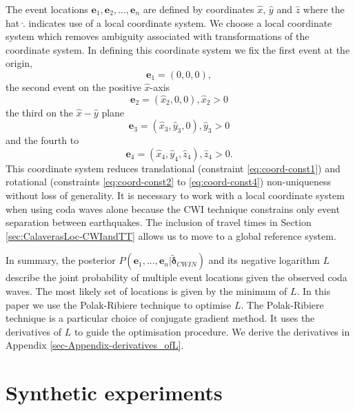 \documentclass[extra]{gji}
\begin{document}
The event locations $\mathbf{e}_1, \mathbf{e}_2, ..., \mathbf{e}_n$
are defined by coordinates $\hat{x}$, $\hat{y}$ and $\hat{z}$
where the hat $\hat{.}$ indicates use of
a local coordinate system. We choose a local coordinate system
which removes ambiguity associated with transformations of the coordinate system.
In defining this coordinate system we fix the first event at the origin,
\begin{equation}
\label{eq:coord-const1}
\mathbf{e}_1 = (0,0,0),
\end{equation}
the second event on the positive $\hat{x}$-axis
\begin{equation}
\label{eq:coord-const2}
\mathbf{e}_2 = (\hat{x}_2, 0, 0), \hat{x}_2>0
\end{equation}
the third on the $\hat{x}-\hat{y}$ plane
\begin{equation}
\label{eq:coord-const3}
\mathbf{e}_3 = (\hat{x}_3,\hat{y}_3,0), \hat{y}_3>0
\end{equation}
and the fourth to
\begin{equation}
\label{eq:coord-const4}
\mathbf{e}_4 = (\hat{x}_4,\hat{y}_4,\hat{z}_4), \hat{z}_4>0.
\end{equation}
This coordinate system reduces translational (constraint \ref{eq:coord-const1})
and rotational (constraints \ref{eq:coord-const2} to \ref{eq:coord-const4}) non-uniqueness
without loss of generality. It is necessary to work with a local coordinate
system when using coda waves alone because the CWI technique constrains only event separation
between earthquakes. The inclusion of travel times in Section \ref{sec:CalaverasLoc-CWIandTT}
allows us to move to a global reference system.

In summary, the posterior $P(\mathbf{e}_1,...,\mathbf{e}_n | \widetilde{\mathbf{\delta}}_{CWIN})$ and its negative
logarithm $L$ describe the joint probability of multiple event locations given the observed coda waves.
The most likely set of locations is given by the minimum of $L$.   In this paper we use the Polak-Ribiere
technique \citep{dr_Press87a} to optimise $L$. The Polak-Ribiere
technique is a particular choice of conjugate gradient method. It uses the
derivatives of $L$ to guide the optimisation procedure. We derive the derivatives in Appendix \ref{sec-Appendix-derivatives_ofL}.

\section{Synthetic experiments}
\label{sec:benchmarking}
\end{document}
